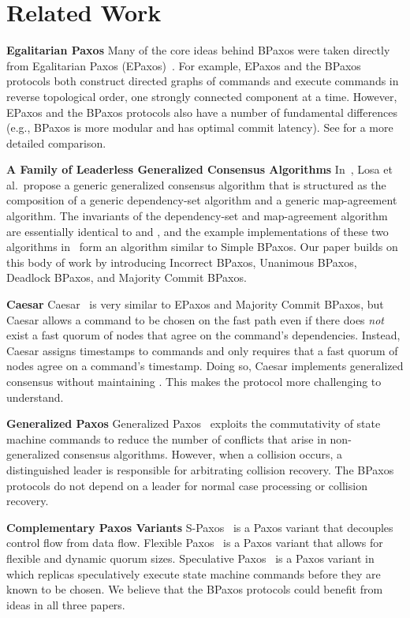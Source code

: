 \section{Related Work}
\newcommand{\condensedparagraph}[1]{\textbf{#1}\;}

\condensedparagraph{Egalitarian Paxos}
Many of the core ideas behind BPaxos were taken directly from Egalitarian Paxos
(EPaxos)~\cite{moraru2013there, moraru2013proof}. For example, EPaxos and the
BPaxos protocols both construct directed graphs of commands and execute
commands in reverse topological order, one strongly connected component at a
time. However, EPaxos and the BPaxos protocols also have a number of
fundamental differences (e.g., BPaxos is more modular and has optimal commit
latency). See  for a more detailed comparison.

\condensedparagraph{A Family of Leaderless Generalized Consensus Algorithms}
In~\cite{losa2016brief}, Losa et al.\ propose a generic generalized consensus
algorithm that is structured as the composition of a generic dependency-set
algorithm and a generic map-agreement algorithm. The invariants of the
dependency-set and map-agreement algorithm are essentially identical to
 and , and the example
implementations of these two algorithms in~\cite{losa2016brief} form an
algorithm similar to Simple BPaxos. Our paper builds on this body of work by
introducing Incorrect BPaxos, Unanimous BPaxos, Deadlock BPaxos, and Majority
Commit BPaxos.

\condensedparagraph{Caesar}
Caesar~\cite{arun2017speeding} is very similar to EPaxos and Majority Commit
BPaxos, but Caesar allows a command to be chosen on the fast path even if there
does \emph{not} exist a fast quorum of nodes that agree on the command's
dependencies. Instead, Caesar assigns timestamps to commands and only requires
that a fast quorum of nodes agree on a command's timestamp. Doing so, Caesar
implements generalized consensus without maintaining
. This makes the protocol more challenging to
understand.

\condensedparagraph{Generalized Paxos}
Generalized Paxos~\cite{lamport2005generalized} exploits the commutativity of
state machine commands to reduce the number of conflicts that arise in
non-generalized consensus algorithms. However, when a collision occurs, a
distinguished leader is responsible for arbitrating collision recovery. The
BPaxos protocols do not depend on a leader for normal case processing or
collision recovery.

\condensedparagraph{Complementary Paxos Variants}
S-Paxos~\cite{biely2012s} is a Paxos variant that decouples control flow from
data flow. Flexible Paxos~\cite{howard2016flexible} is a Paxos variant that
allows for flexible and dynamic quorum sizes. Speculative
Paxos~\cite{ports2015designing} is a Paxos variant in which replicas
speculatively execute state machine commands before they are known to be
chosen. We believe that the BPaxos protocols could benefit from ideas in all
three papers.
